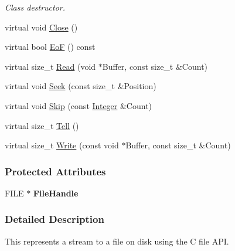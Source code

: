 \begin{DoxyCompactItemize}
\begin{DoxyCompactList}\small\item\em Class destructor. \item\end{DoxyCompactList}\item 
virtual void \hyperlink{classMezzanine_1_1Resource_1_1FileHandleDataStream_a758066090bed23255c8c02f0dee04dc5}{Close} ()
\item 
virtual bool \hyperlink{classMezzanine_1_1Resource_1_1FileHandleDataStream_a69f00d256dd737696d7628ff2aa784d2}{EoF} () const 
\item 
virtual size\_\-t \hyperlink{classMezzanine_1_1Resource_1_1FileHandleDataStream_a3bf9c99e02da81b3e4dbd7b99f3db9e7}{Read} (void $\ast$Buffer, const size\_\-t \&Count)
\item 
virtual void \hyperlink{classMezzanine_1_1Resource_1_1FileHandleDataStream_a7e1d7ceb895878aa3041fdf00c13462b}{Seek} (const size\_\-t \&Position)
\item 
virtual void \hyperlink{classMezzanine_1_1Resource_1_1FileHandleDataStream_a72d74a2a15281635afb443d66e64d16b}{Skip} (const \hyperlink{namespaceMezzanine_ac3576e52af3c62d13dde94829e0c5465}{Integer} \&Count)
\item 
virtual size\_\-t \hyperlink{classMezzanine_1_1Resource_1_1FileHandleDataStream_abf537e96aa6b764a9006d22df3f448a1}{Tell} ()
\item 
virtual size\_\-t \hyperlink{classMezzanine_1_1Resource_1_1FileHandleDataStream_aa966e5def906aae90c8f5bf0aa9e8678}{Write} (const void $\ast$Buffer, const size\_\-t \&Count)
\end{DoxyCompactItemize}
\subsubsection*{Protected Attributes}
\begin{DoxyCompactItemize}
\item 
\hypertarget{classMezzanine_1_1Resource_1_1FileHandleDataStream_a0c464c8576505078282ae3a4d755f82d}{
FILE $\ast$ {\bfseries FileHandle}}
\label{classMezzanine_1_1Resource_1_1FileHandleDataStream_a0c464c8576505078282ae3a4d755f82d}

\end{DoxyCompactItemize}


\subsubsection{Detailed Description}
This represents a stream to a file on disk using the C file API. 

